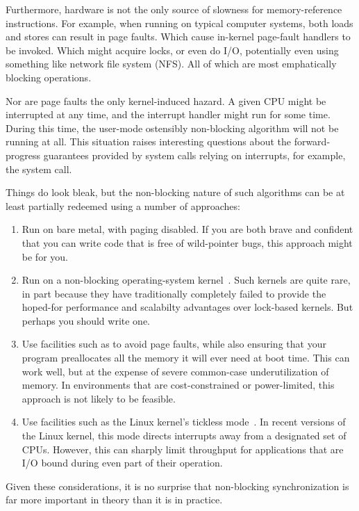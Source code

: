 Furthermore, hardware is not the only source of slowness for
memory-reference instructions.
For example, when running on typical computer systems, both loads and
stores can result in page faults.
Which cause in-kernel page-fault handlers to be invoked.
Which might acquire locks, or even do I/O, potentially even using
something like network file system (NFS)\@.
All of which are most emphatically blocking operations.

Nor are page faults the only kernel-induced hazard.
A given CPU might be interrupted at any time, and the interrupt
handler might run for some time.
During this time, the user-mode ostensibly non-blocking algorithm
will not be running at all.
This situation raises interesting questions about the forward-progress
guarantees provided by system calls relying on interrupts, for example,
the  system call.

Things do look bleak, but the non-blocking nature of such algorithms
can be at least partially redeemed using a number of approaches:

\begin{enumerate}
\item	Run on bare metal, with paging disabled.
	If you are both brave and confident that you can write code that
	is free of wild-pointer bugs, this approach might be for you.
\item	Run on a non-blocking operating-system kernel~\cite{Cheriton96a}.
	Such kernels are quite rare, in part because they have
	traditionally completely failed to provide the hoped-for
	performance and scalabilty advantages over lock-based kernels.
	But perhaps you should write one.
\item	Use facilities such as  to avoid page faults,
	while also ensuring that your program preallocates all the
	memory it will ever need at boot time.
	This can work well, but at the expense of severe common-case
	underutilization of memory.
	In environments that are cost-constrained or power-limited,
	this approach is not likely to be feasible.
\item	Use facilities such as the Linux kernel's
	 tickless mode~\cite{JonCorbet2013NO-HZ-FULL}.
	In recent versions of the Linux kernel, this mode directs
	interrupts away from a designated set of CPUs.
	However, this can sharply limit throughput for applications that
	are I/O bound during even part of their operation.
\end{enumerate}

Given these considerations, it is no surprise that non-blocking
synchronization is far more important in theory than it is in practice.

